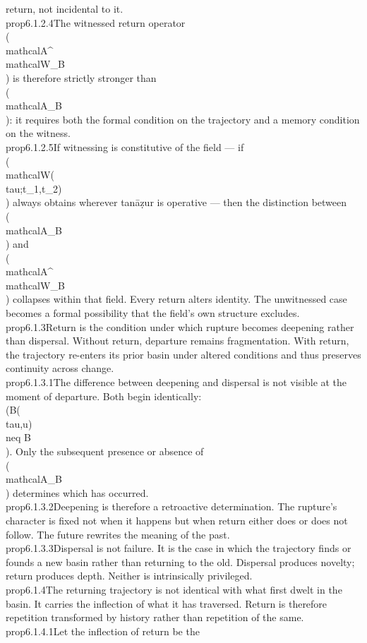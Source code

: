 {{{return, not incidental to it.}\n\n\\prop{6.1.2.4}{The witnessed return operator \\(\\mathcal{A}^{\\mathcal{W}}_B\\) is therefore strictly stronger than \\(\\mathcal{A}_B\\): it requires both the formal condition on the trajectory and a memory condition on the witness.}\n\n\\prop{6.1.2.5}{If witnessing is constitutive of the field — if \\(\\mathcal{W}(\\tau;t_1,t_2)\\) always obtains wherever tanāẓur is operative — then the distinction between \\(\\mathcal{A}_B\\) and \\(\\mathcal{A}^{\\mathcal{W}}_B\\) collapses within that field. Every return alters identity. The unwitnessed case becomes a formal possibility that the field's own structure excludes.}\n\n\\prop{6.1.3}{Return is the condition under which rupture becomes deepening rather than dispersal. Without return, departure remains fragmentation. With return, the trajectory re-enters its prior basin under altered conditions and thus preserves continuity across change.}\n\n\\prop{6.1.3.1}{The difference between deepening and dispersal is not visible at the moment of departure. Both begin identically: \\(B(\\tau,u)\\neq B\\). Only the subsequent presence or absence of \\(\\mathcal{A}_B\\) determines which has occurred.}\n\n\\prop{6.1.3.2}{Deepening is therefore a retroactive determination. The rupture's character is fixed not when it happens but when return either does or does not follow. The future rewrites the meaning of the past.}\n\n\\prop{6.1.3.3}{Dispersal is not failure. It is the case in which the trajectory finds or founds a new basin rather than returning to the old. Dispersal produces novelty; return produces depth. Neither is intrinsically privileged.}\n\n\\prop{6.1.4}{The returning trajectory is not identical with what first dwelt in the basin. It carries the inflection of what it has traversed. Return is therefore repetition transformed by history rather than repetition of the same.}\n\n\\prop{6.1.4.1}{Let the inflection of return be the }}}

